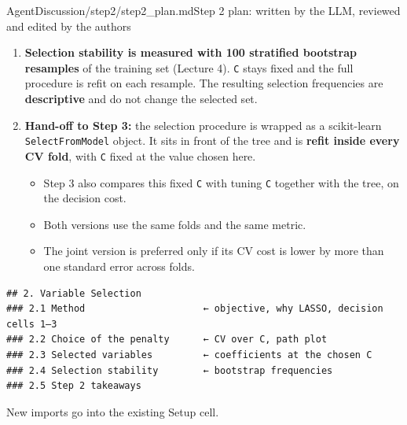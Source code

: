 \begin{mdfile}{AgentDiscussion/\allowbreak{}step2/\allowbreak{}step2\_plan.md}{Step 2 plan: written by the LLM, reviewed and edited by the authors}
\begin{enumerate}
  \begin{itemize}
  \tightlist
  \item
    Why log-loss: it is a proper scoring rule for probabilities, the classification counterpart of the validation MSE used in Lectures 3--4.
  \item
    Grid: 13 values of \texttt{C} from \(10^{-3}\) to \(1\), evenly spaced on a log scale.
  \item
    The same CV splitter (\texttt{StratifiedKFold(5,\ shuffle=True,\ random\_state=SEED)}) is reused in Step 3.
  \end{itemize}
\item
  \textbf{Selection stability is measured with 100 stratified bootstrap resamples} of the training set (Lecture 4). \texttt{C} stays fixed and the full procedure is refit on each resample. The resulting selection frequencies are \textbf{descriptive} and do not change the selected set.
\item
  \textbf{Hand-off to Step 3:} the selection procedure is wrapped as a scikit-learn \texttt{SelectFromModel} object. It sits in front of the tree and is \textbf{refit inside every CV fold}, with \texttt{C} fixed at the value chosen here.

  \begin{itemize}
  \tightlist
  \item
    Step 3 also compares this fixed \texttt{C} with tuning \texttt{C} together with the tree, on the decision cost.
  \item
    Both versions use the same folds and the same metric.
  \item
    The joint version is preferred only if its CV cost is lower by more than one standard error across folds.
  \end{itemize}
\end{enumerate}


\begin{Verbatim}[breaklines, fontsize=\footnotesize]
## 2. Variable Selection
### 2.1 Method                     ← objective, why LASSO, decision cells 1–3
### 2.2 Choice of the penalty      ← CV over C, path plot
### 2.3 Selected variables         ← coefficients at the chosen C
### 2.4 Selection stability        ← bootstrap frequencies
### 2.5 Step 2 takeaways
\end{Verbatim}


New imports go into the existing Setup cell.


\end{mdfile}
